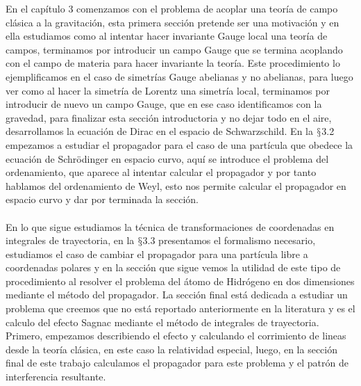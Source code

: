 En el capítulo 3 comenzamos con el problema de acoplar una teoría de campo clásica a la gravitación, esta primera sección pretende ser una motivación y en ella estudiamos como al intentar hacer invariante Gauge local una teoría de campos, terminamos por introducir un campo Gauge que se termina acoplando con el campo de materia para hacer invariante la teoría. Este procedimiento lo ejemplificamos en el caso de simetrías Gauge abelianas y no abelianas, para luego ver como al hacer la simetría de Lorentz una simetría local, terminamos por introducir de nuevo un campo Gauge, que en ese caso identificamos con la gravedad, para finalizar esta sección introductoria y no dejar todo en el aire, desarrollamos la ecuación de Dirac en el espacio de Schwarzschild. En la  $\mathsection$3.2 empezamos a estudiar el propagador para el caso de una partícula que obedece la ecuación de Schrödinger en espacio curvo, aquí se introduce el problema del ordenamiento, que aparece al intentar calcular el propagador y por tanto hablamos del ordenamiento de Weyl, esto nos permite calcular el propagador en espacio curvo y dar por terminada la sección.
\\
\\
En lo que sigue estudiamos la técnica de transformaciones de coordenadas en integrales de trayectoria, en la  $\mathsection$3.3 presentamos el formalismo necesario, estudiamos el caso de cambiar el propagador para una partícula libre a coordenadas polares y en la sección que sigue vemos la utilidad de este tipo de procedimiento al resolver el problema del átomo de Hidrógeno en dos dimensiones mediante el método del propagador. La sección final está dedicada a estudiar un problema que creemos que no está reportado anteriormente en la literatura y es el calculo del efecto Sagnac mediante el método de integrales de trayectoria. Primero, empezamos describiendo el efecto y calculando el corrimiento de lineas desde la teoría clásica, en este caso la relatividad especial, luego, en la sección final de este trabajo calculamos el propagador para este problema y el patrón de interferencia resultante.
\\
\\
